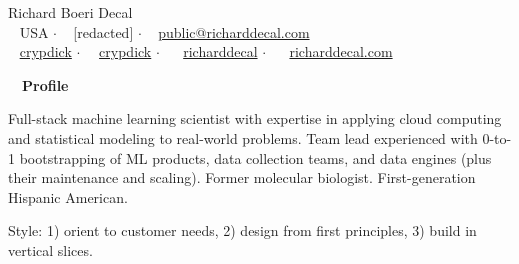 \documentclass[a4paper,12pt]{article}
\newcommand{\resheading}[1]{{\hspace{-9pt} \colorbox{mygrey}{\begin{minipage}{\textwidth}{\textmd{~~\large \textbf{#1} \vphantom{p\^{E}}}}\end{minipage}}\vspace{6pt}} }
\begin{document}
    \begin{center}
    {\Huge Richard Boeri Decal}
        \\
        {\small \faMapMarker~ USA $\cdot$ \faPhone~ [redacted] $\cdot$ \faEnvelope~ \href{mailto:public@richarddecal.com}{public@richarddecal.com}  \\ \faGithubAlt~ \href{https://github.com/crypdick}{crypdick} $\cdot$~\faStackOverflow~  \href{https://stackoverflow.com/users/4212158/crypdick}{crypdick} $\cdot$ ~\faLinkedin~ \href{https://www.linkedin.com/in/richarddecal/}{richarddecal}  $\cdot$ ~\faHome~  \href{https://www.richarddecal.com}{richarddecal.com}}
    \end{center}

    \resheading{Profile}

    Full-stack machine learning scientist with expertise in applying cloud computing and statistical modeling to real-world problems.
    Team lead experienced with 0-to-1 bootstrapping of ML products, data collection teams, and data engines (plus their
     maintenance and scaling).
    Former molecular biologist. First-generation Hispanic American.

    \vspace{0.5em} %

    Style: 1) orient to customer needs, 2) design from first principles, 3) build in vertical slices.\\


%
\end{document}
